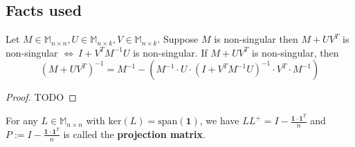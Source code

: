 \subsection{Facts used}

\begin{HXf}
 Let $ M \in \mathbb{M}_{n \times n} , U \in \mathbb{M}_{n \times k}, V \in \mathbb{M}_{n \times k}$. Suppose $M$ is non-singular then $M + UV^T$ is non-singular $\iff \ I + V^T M^{-1} U$ is non-singular. If $M + UV^T$ is non-singular, then 
 $$ (M + UV^T)^{-1} = M^{-1} - \left( M^{-1} \cdot U \cdot (I + V^TM^{-1}U)^{-1} \cdot V^T \cdot M^{-1}\right) $$
\end{HXf}

\begin{proof}
 TODO
\end{proof}

\begin{HXf}
 For any $L \in \mathbb{M}_{n \times n}$ with $\text{ker}(L) = \text{span}(\textbf{1})$, we have $LL^+ = I - \frac{\textbf{1} \cdot \textbf{1}^T}{n}$ and $P := I - \frac{\textbf{1} \cdot \textbf{1}^T}{n}$ is called the \textbf{projection matrix}. 
\end{HXf}

